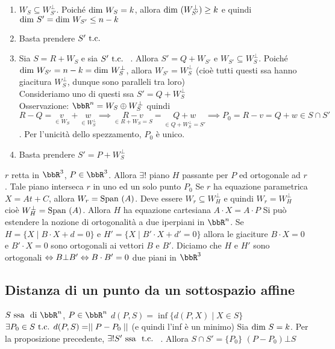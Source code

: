 \documentclass[a4paper,NoNotes,GeneralMath]{stdmdoc}
\newcommand{\ssa}{\mbox{ ssa }}
\newcommand{\di}{\mbox{ di }}
\begin{document}
		\begin{enumerate}
			\item $W_S \subseteq W_{S'}^\bot$. Poiché $\mbox{dim } W_S = k$, allora $\mbox{dim }(W_{S'}^\bot) \ge k$ e quindi $\mbox{dim } S' = \mbox{dim } W_{S'} \le n-k$
			\item Basta prendere $S' \mbox{ t.c. }$ 
			\item Sia $S = R + W_S$ e sia $S' \mbox{ t.c. }$ . Allora $S' = Q + W_{S'}$ e $W_{S'} \subseteq W_S^\bot$. Poiché $\mbox{dim } W_{S'} = n-k = \mbox{dim } W_S^\bot$, allora $W_{S'} = W_S^\bot$ (cioè tutti questi ssa hanno giacitura $W_S^\bot$, dunque sono paralleli tra loro) \\
				Consideriamo uno di questi ssa $S' = Q + W_S^\bot$ \\
				Osservazione: $\bbR^n = W_S \oplus W_S^\bot$ quindi $R-Q = \underset{\in W_S}{v} + \underset{\in W_S^\bot}{w} \implies \underset{\in R + W_S = S}{R - v} = \underset{\in Q + W_S^\bot = S'}{Q + w} \implies P_0 = R - v = Q + w \in S \cap S'$. Per l'unicità dello spezzamento, $P_0$ è unico.
			\item Basta prendere $S' = P + W_S^\bot$
		\end{enumerate}
	 $r$ retta in $\bbR^3$, $P \in \bbR^3$. Allora $\exists !$ piano $H$ passante per $P$ ed ortogonale ad $r$. Tale piano interseca $r$ in uno ed un solo punto $P_0$
	\Osservazione Se $r$ ha equazione parametrica $X = At + C$, allora $W_r = \mbox{Span }(A)$. Deve essere $W_r \subseteq W_H^\bot$ e quindi $W_r = W_H^\bot$ cioè $W_H^\bot = \mbox{Span }(A)$. Allora $H$ ha equazione cartesiana $A\cdot X = A\cdot P$
	\Osservazione Si può estendere la nozione di ortogonalità a due iperpiani in $\bbR^n$. Se $H = \{X \mid B\cdot X + d = 0\}$ e $H' = \{X \mid B'\cdot X + d' = 0\}$ allora le giaciture $B\cdot X = 0$ e $B'\cdot X = 0$ sono ortogonali ai vettori $B$ e $B'$. Diciamo che $H$ e $H'$ sono ortogonali $\Leftrightarrow B \bot B' \Leftrightarrow B\cdot B' = 0$
	\Esempio due piani in $\bbR^3$

	\subsection*{Distanza di un punto da un sottospazio affine}
	$S \ssa \di \bbR^n$, $P \in \bbR^n$
	\Definizione $d(P,S) = \inf \{d(P,X) \mid X\in S\}$
	\Proposizione $\exists P_0 \in S \mbox{ t.c. } d(P,S) = \mid\mid P-P_0 \mid\mid$ (e quindi l'inf è un minimo)
	\Dimostrazione Sia $\mbox{dim } S = k$. Per la proposizione precedente, $\exists ! S' \ssa \tc$ . Allora $S\cap S' = \{P_0\}$
	\Osservazione $(P-P_0) \bot S$
	
\end{document}
